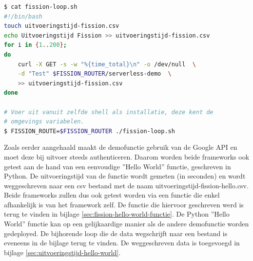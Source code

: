 \begin{lstlisting}[language=bash]
$ cat fission-loop.sh
#!/bin/bash
touch uitvoeringstijd-fission.csv
echo Uitvoeringstijd Fission >> uitvoeringstijd-fission.csv
for i in {1..200};
do
    curl -X GET -s -w "%{time_total}\n" -o /dev/null  \
    -d "Test" $FISSION_ROUTER/serverless-demo  \
    >> uitvoeringstijd-fission.csv
done

# Voer uit vanuit zelfde shell als installatie, deze kent de 
# omgevings variabelen.
$ FISSION_ROUTE=$FISSION_ROUTER ./fission-loop.sh
\end{lstlisting}

Zoals eerder aangehaald maakt de demofunctie gebruik van de Google API en moet deze bij uitvoer steeds authenticeren. Daarom worden beide frameworks ook getest aan de hand van een eenvoudige ''Hello World'' functie, geschreven in Python. De uitvoeringstijd van de functie wordt gemeten (in seconden) en wordt weggeschreven naar een csv bestand met de naam uitvoeringstijd-fission-hello.csv. Beide frameworks zullen dus ook getest worden via een functie die enkel afhankelijk is van het framework zelf. De functie die hiervoor geschreven werd is terug te vinden in bijlage \ref{sec:fission-hello-world-functie}. De Python ''Hello World'' functie kan op een gelijkaardige manier als de andere demofunctie worden gedeployed. De bijhorende loop die de data wegschrijft naar een bestand is eveneens in de bijlage terug te vinden. De weggeschreven data is toegevoegd in bijlage \ref{sec:uitvoeringstijd-hello-world}.


